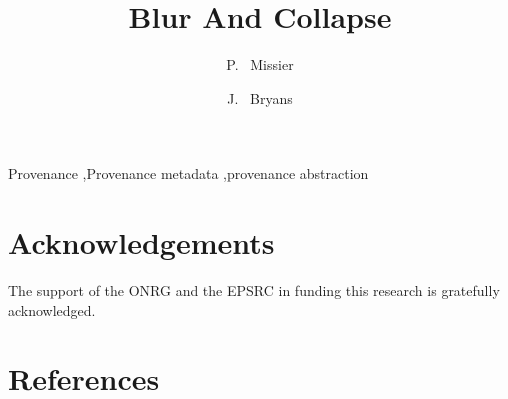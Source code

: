 \documentclass{elsarticle}
\begin{document}
\title{Blur And Collapse}


\author[ncl]{P. ~Missier }

\author[cov]{J. ~Bryans}


\address[ncl]{School of Computing Science, Newcastle University, UK}
\address[cov]{Institute for Future Transport and Cities, Coventry University, UK}




\begin{abstract}

\end{abstract}

\begin{keyword}
Provenance \sep Provenance metadata \sep provenance abstraction 
\end{keyword}

\maketitle


\section*{Acknowledgements}

The support of the ONRG and the EPSRC in funding this research is gratefully acknowledged. 

\section*{References}

%
%

\end{document}
